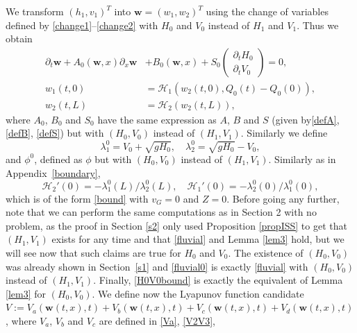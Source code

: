 We transform $(h_{1},v_{1})^{T}$ into $\boldsymbol{w}=(w_{1},w_{2})^{T}$ using the change of variables defined by
\eqref{change1}--\eqref{change2} with $H_{0}$ and $V_{0}$ instead of $H_{1}$ and $V_{1}$. Thus we obtain
\begin{equation}
\begin{split}
\partial_{t}\boldsymbol{w}+A_{0}(\boldsymbol{w},x)\partial_{x}\boldsymbol{w}&+B_{0}(\boldsymbol{w},x)+S_{0}\begin{pmatrix}\partial_{t}H_{0}\\ \partial_{t}V_{0}\end{pmatrix}=0,\\
w_{1}(t,0)&=\mathcal{H}_{1}(w_{2}(t,0),Q_{0}(t)-Q_{0}(0)),\\
w_{2}(t,L)&=\mathcal{H}_{2}(w_{2}(t,L)),
\end{split}
\label{sysw}
\end{equation}
where $A_{0}$, $B_{0}$ and $S_{0}$ have the same expression as $A$, $B$ and $S$ (given by\eqref{defA}, \eqref{defB}, \eqref{defS}) but with $(H_{0},V_{0})$ instead of $(H_{1}, V_{1})$. Similarly we define
\begin{equation*}
\lambda_{1}^{0}=V_{0}+\sqrt{gH_{0}},\quad\lambda_{2}^{0}=\sqrt{gH_{0}}-V_{0},
\end{equation*}
and $\phi^{0}$, defined as $\phi$ but with $(H_{0},V_{0})$ instead of $(H_{1}, V_{1})$.
Similarly as in Appendix~\ref{boundary},
\begin{equation*}
\mathcal{H}_{2}'(0)=-\lambda_{1}^{0}(L)/\lambda_{2}^{0}(L),\quad \mathcal{H}_{1}'(0)=-\lambda_{2}^{0}(0)/\lambda_{1}^{0}(0),
\end{equation*}
which is of the form \eqref{bound} with $v_{G}=0$ and $Z=0$.
Before going any further, note that we can perform the same computations as in Section 2 with no problem,
as the proof in Section \ref{s2} only used Proposition \ref{propISS} to get that $(H_{1},V_{1})$ exists for any time and that \eqref{fluvial} and Lemma \ref{lem3} hold, but we will see now that such claims are true for $H_{0}$ and $V_{0}$.
The existence of $(H_{0},V_{0})$ was already shown in Section~\ref{s1} and \eqref{fluvial0} is exactly \eqref{fluvial} with $(H_{0},V_{0})$ instead of $(H_{1},V_{1})$. Finally, \eqref{H0V0bound} is exactly the equivalent of Lemma \ref{lem3} for $(H_{0},V_{0})$.
We define now the Lyapunov function candidate $V:=V_{a}(\boldsymbol{w}(t,x),t)+V_{b}(\boldsymbol{w}(t,x),t)+V_{c}(\boldsymbol{w}(t,x),t)+V_{d}(\boldsymbol{w}(t,x),t)$, where $V_{a}$, $V_{b}$ and $V_{c}$ are defined in \eqref{Va}, \eqref{V2V3},
